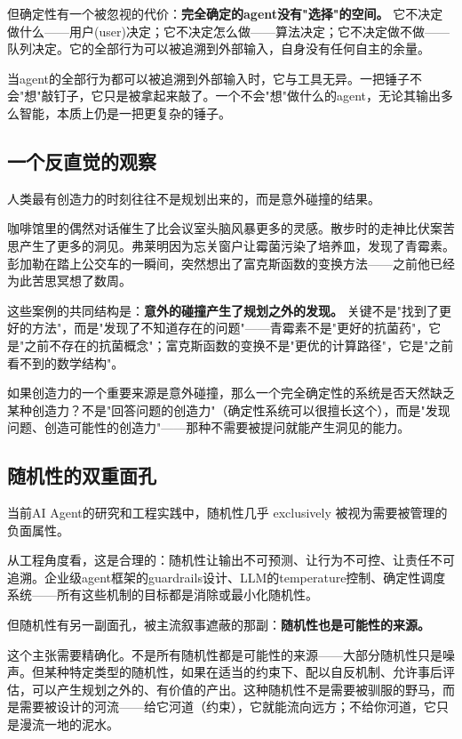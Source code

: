 \documentclass[12pt,a4paper]{ctexart}
\begin{document}
但确定性有一个被忽视的代价：\textbf{完全确定的agent没有"选择"的空间。} 它不决定做什么——用户(user)决定；它不决定怎么做——算法决定；它不决定做不做——队列决定。它的全部行为可以被追溯到外部输入，自身没有任何自主的余量。

当agent的全部行为都可以被追溯到外部输入时，它与工具无异。一把锤子不会"想"敲钉子，它只是被拿起来敲了。一个不会"想"做什么的agent，无论其输出多么智能，本质上仍是一把更复杂的锤子。

\subsection{一个反直觉的观察}

人类最有创造力的时刻往往不是规划出来的，而是意外碰撞的结果。

咖啡馆里的偶然对话催生了比会议室头脑风暴更多的灵感。散步时的走神比伏案苦思产生了更多的洞见。弗莱明因为忘关窗户让霉菌污染了培养皿，发现了青霉素\cite{fleming1929}。彭加勒在踏上公交车的一瞬间，突然想出了富克斯函数的变换方法——之前他已经为此苦思冥想了数周\cite{poincare1908}。

这些案例的共同结构是：\textbf{意外的碰撞产生了规划之外的发现。} 关键不是"找到了更好的方法"，而是"发现了不知道存在的问题"——青霉素不是"更好的抗菌药"，它是"之前不存在的抗菌概念"；富克斯函数的变换不是"更优的计算路径"，它是"之前看不到的数学结构"。

如果创造力的一个重要来源是意外碰撞，那么一个完全确定性的系统是否天然缺乏某种创造力？不是"回答问题的创造力"（确定性系统可以很擅长这个），而是"发现问题、创造可能性的创造力"——那种不需要被提问就能产生洞见的能力。

\subsection{随机性的双重面孔}

当前AI Agent的研究和工程实践中，随机性几乎 exclusively 被视为需要被管理的负面属性。

从工程角度看，这是合理的：随机性让输出不可预测、让行为不可控、让责任不可追溯。企业级agent框架的guardrails设计、LLM的temperature控制、确定性调度系统——所有这些机制的目标都是消除或最小化随机性。

但随机性有另一副面孔，被主流叙事遮蔽的那副：\textbf{随机性也是可能性的来源。}

这个主张需要精确化。不是所有随机性都是可能性的来源——大部分随机性只是噪声。但某种特定类型的随机性，如果在适当的约束下、配以自反机制、允许事后评估，可以产生规划之外的、有价值的产出。这种随机性不是需要被驯服的野马，而是需要被设计的河流——给它河道（约束），它就能流向远方；不给你河道，它只是漫流一地的泥水。
\end{document}
